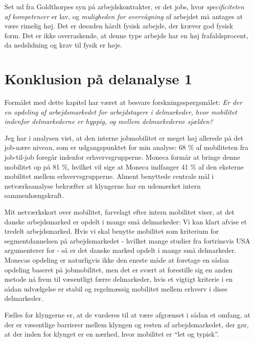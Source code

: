 Set ud fra Goldthorpes syn på arbejdskontrakter, er det jobs, hvor \emph{specificiteten af kompetencer} er lav, og \emph{muligheden for overvågning} af arbejdet må antages at være rimelig høj. Det er desuden hårdt fysisk arbejde, der kræver god fysisk form. Det er ikke overraskende, at denne type arbejde har en høj frafaldsprocent, da nedslidning og krav til fysik er høje. %



\section{Konklusion på delanalyse 1 \label{sec konklusion delanalyse1}}

Formålet med dette kapitel har været at besvare forskningsspørgsmålet: \emph{Er der en opdeling af arbejdsmarkedet for arbejdstagere i delmarkeder, hvor mobilitet indenfor delmarkederne er hyppig, og mellem delmarkederne sjælden?}

Jeg har i analysen vist, at den interne jobmobilitet er meget høj allerede på det job-nære niveau, som er udgangspunktet for min analyse: 68 \% af mobiliteten fra job-til-job foregår indenfor erhvervsgrupperne. Moneca formår at bringe denne mobilitet op på  81 \%, hvilket vil sige at Moneca indfanger 41 \% af den eksterne mobilitet mellem erhvervsgrupperne. Alment benyttede centrale mål i netværksanalyse bekræfter at klyngerne har en udemærket intern sammenhængskraft. 

Mit netværkskort over mobilitet, farvelagt efter intern mobilitet viser, at det danske arbejdsmarked er opdelt i mange små delmarkeder: Vi kan klart afvise et tredelt arbejdsmarked. Hvis vi skal benytte mobilitet som kriterium for segmentdannelsen på arbejdsmarkedet - hvilket mange studier fra fortrinsvis USA argumenterer for -  så er det danske marked opdelt i mange små delmarkeder. Monecas opdeling er naturligvis ikke den eneste måde at foretage en sådan opdeling baseret på jobmobilitet, men det er svært at forestille sig en anden metode nå frem til væsentligt færre delmarkeder, hvis et vigtigt kriterie i en sådan udvælgelse er stabil og regelmæssig mobilitet mellem erhverv i disse delmarkeder. 

Fælles for klyngerne er, at de vurderes til at være afgrænset i sådan et omfang, at der er væsentlige barrierer mellem klyngen og resten af arbejdsmarkedet, der gør, at der inden for klynget er en nærhed, hvor mobilitet er “let og typisk”.


